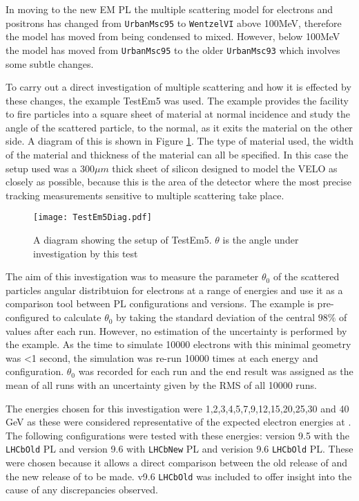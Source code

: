 In moving to the new EM PL the multiple scattering model for electrons and positrons has changed from \texttt{UrbanMsc95} to \texttt{WentzelVI} above 100MeV, therefore the model has moved from being condensed to mixed.  However, below 100MeV the model has moved from \texttt{UrbanMsc95} to the older \texttt{UrbanMsc93} which involves some subtle changes. %

To carry out a direct investigation of multiple scattering and how it is effected by these changes, the \geant example TestEm5 was used. The example provides the facility to fire particles into a square sheet of material at normal incidence and study the angle of the scattered particle, to the normal, as it exits the material on the other side. A diagram of this is shown in Figure \ref{fig:TestDiam}.  The type of material used, the width of the material and thickness of the material can all be specified. In this case the setup used was a $300 \mu m$ thick sheet of silicon designed to model the \lhcb VELO as closely as possible, because this is the area of the detector where the most precise tracking measurements sensitive to multiple scattering take place.
\begin{figure}[h]
  \centering
  \texttt{[image: TestEm5Diag.pdf]}
  \caption{A diagram showing the setup of TestEm5.  $\theta$ is the angle under investigation by this test}
  \label{fig:TestDiam}
\end{figure}

The aim of this investigation was to measure the parameter $\theta_0$ of the scattered particles angular distribtuion for electrons at a range of energies and use it as a comparison tool between PL configurations and \geant versions.  The \geant example is pre-configured to calculate $\theta_0$ by taking the standard deviation of the central $98\%$ of values after each run.  However, no estimation of the uncertainty is performed by the example. As the time to simulate 10000 electrons with this minimal geometry was <1 second, the simulation was re-run 10000 times at each energy and configuration.  $\theta_0$ was recorded for each run and the end result was assigned as the mean of all runs with an uncertainty given by the RMS of all 10000 runs.

The energies chosen for this investigation were 1,2,3,4,5,7,9,12,15,20,25,30 and 40 GeV as these were considered representative of the expected electron energies at \lhcb. The following configurations were tested with these energies: \geant version 9.5 with the \texttt{LHCbOld} PL and version 9.6 with \texttt{LHCbNew} PL and verision 9.6 \texttt{LHCbOld} PL.  These were chosen because it allows a direct comparison between the old release of \geant and the new release of \geant to be made.  v9.6 \texttt{LHCbOld} was included to offer insight into the cause of any discrepancies observed.

